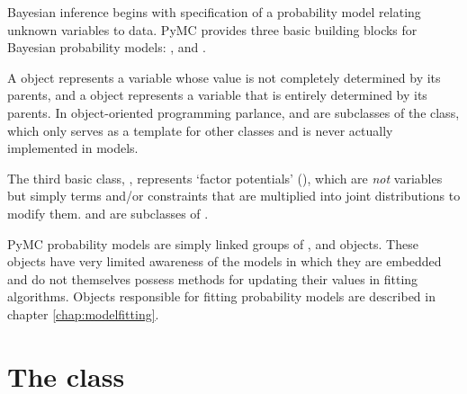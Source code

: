 
Bayesian inference begins with specification of a probability model relating unknown variables to data. PyMC provides three basic building blocks for Bayesian probability models: ,  and . 

A  object represents a variable whose value is not completely determined by its parents, and a  object represents a variable that is entirely determined by its parents. In object-oriented programming parlance,  and  are subclasses of the  class, which only serves as a template for other classes and is never actually implemented in models. 

The third basic class, , represents `factor potentials' (\cite{dawidmarkov,Jordan:2004p5439}), which are \emph{not} variables but simply terms and/or constraints that are multiplied into joint distributions to modify them.  and  are subclasses of .



\medskip
PyMC probability models are simply linked groups of ,  and  objects. These objects have very limited awareness of the models in which they are embedded and do not themselves possess methods for updating their values in fitting algorithms. Objects responsible for fitting probability models are described in chapter \ref{chap:modelfitting}.
 

\hypertarget{stochastic}{}
\section[The Stochastic class]{The  class}
\label{stochastic}

